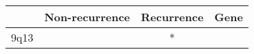 \begin{tabular}{lccr}
\toprule
{} & Non-recurrence & Recurrence & Gene \\
\midrule
9q13 &                &          * &      \\
\bottomrule
\end{tabular}

